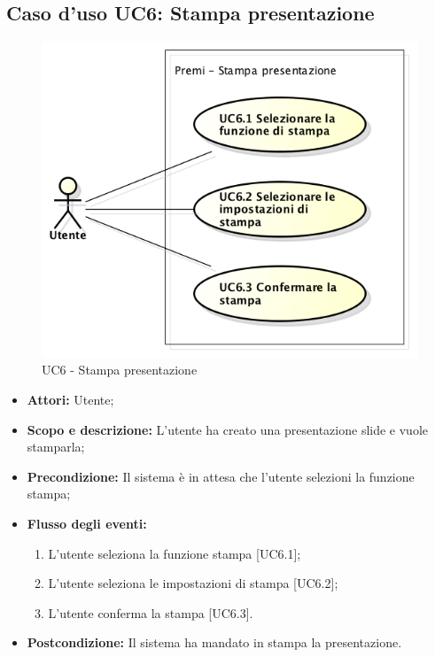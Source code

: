 \subsection{Caso d'uso UC6: Stampa presentazione}
\begin{figure}[h] 
	\centering 
	\includegraphics[scale=0.45] {img/UC6.png} 
	\caption{UC6 - Stampa presentazione} 
\end{figure}

\begin{itemize}
	\item \textbf{Attori:} Utente;
	\item \textbf{Scopo e descrizione:} L'utente ha creato una presentazione slide e vuole stamparla;
	\item \textbf{Precondizione:} Il sistema è in attesa che l'utente selezioni la funzione stampa;
	\item \textbf{Flusso degli eventi:}
	\begin{enumerate}
		\item L'utente seleziona la funzione stampa [UC6.1];
		\item L'utente seleziona le impostazioni di stampa [UC6.2];
		\item L'utente conferma la stampa [UC6.3].
	\end{enumerate}
	\item \textbf{Postcondizione:} Il sistema ha mandato in stampa la presentazione.
\end{itemize}

